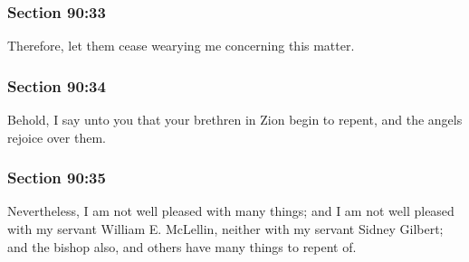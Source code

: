 	\subsubsection{Section 90:33} %
		\label{DC90-33}

		Therefore, let them cease wearying me concerning this matter.


	\subsubsection{Section 90:34} %
		\label{DC90-34}

		Behold, I say unto you that your brethren in Zion begin to repent, and the angels rejoice over them.


	\subsubsection{Section 90:35} %
		\label{DC90-35}

		Nevertheless, I am not well pleased with many things; and I am not well pleased with my servant William E. McLellin, neither with my servant Sidney Gilbert; and the bishop also, and others have many things to repent of.


